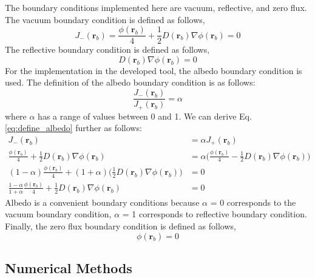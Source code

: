 The boundary conditions implemented here are vacuum, reflective, and zero flux. The vacuum boundary condition is defined as follows,
\begin{equation}
    J_{-}(\textbf{r}_b) = \frac{\phi(\textbf{r}_b)}{4} + \frac{1}{2}D(\textbf{r}_b) \nabla \phi(\textbf{r}_b) = 0
\end{equation}
The reflective boundary condition is defined as follows,
\begin{equation}
    D(\textbf{r}_b) \nabla \phi(\textbf{r}_b) = 0
\end{equation}
For the implementation in the developed tool, the albedo boundary condition is used. The definition of the albedo boundary condition is as follows:
\begin{equation}\label{eq:define_albedo}
    \frac{J_{-}(\textbf{r}_b)}{J_{+}(\textbf{r}_b)} = \alpha
\end{equation}
where $\alpha$ has a range of values between 0 and 1. We can derive Eq. \ref{eq:define_albedo} further as follows:
\begin{equation}
    \begin{aligned}
        J_{-}(\textbf{r}_b) &= \alpha J_{+}(\textbf{r}_b)\\
        \frac{\phi(\textbf{r}_b)}{4} + \frac{1}{2} D(\textbf{r}_b) \nabla \phi(\textbf{r}_b) &= \alpha \biggl( \frac{\phi(\textbf{r}_b)}{4} - \frac{1}{2} D(\textbf{r}_b) \nabla \phi(\textbf{r}_b) \biggr) \\
        (1-\alpha) \frac{\phi(\textbf{r}_b)}{4} + (1+\alpha) \biggl( \frac{1}{2} D(\textbf{r}_b) \nabla \phi(\textbf{r}_b) \biggr) &= 0  \\
        \frac{1-\alpha}{1+\alpha} \frac{\phi(\textbf{r}_b)}{4} + \frac{1}{2} D(\textbf{r}_b) \nabla \phi(\textbf{r}_b) &= 0
    \end{aligned}
\end{equation}
Albedo is a convenient boundary conditions because $\alpha$ = 0 corresponds to the vacuum boundary condition, $\alpha$ = 1 corresponds to reflective boundary condition. Finally, the zero flux boundary condition is defined as follows,
\begin{equation}
    \phi(\textbf{r}_b) = 0
\end{equation}

\subsection{Numerical Methods}

